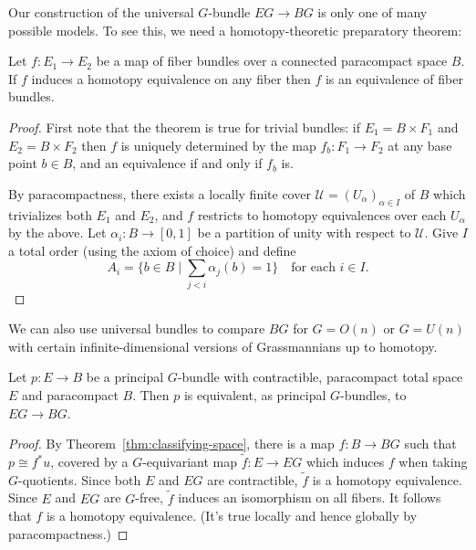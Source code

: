\documentclass[a4paper,openany]{scrbook}
\begin{document}
Our construction of the universal $G$-bundle $EG \to BG$ is only one of many possible models. To see this, we need a homotopy-theoretic preparatory theorem:
\begin{thm}\label{thm:fiber-homotopy-theorem}
Let $f\colon E_1 \to E_2$ be a map of fiber bundles over a connected paracompact space $B$. If $f$ induces a homotopy equivalence on any fiber then $f$ is an equivalence of fiber bundles.
\end{thm}
\begin{proof}
First note that the theorem is true for trivial bundles: if $E_1 = B \times F_1$ and $E_2 = B \times F_2$ then $f$ is uniquely determined by the map $f_b\colon F_1 \to F_2$ at any base point $b\in B$, and an equivalence if and only if $f_b$ is.

By paracompactness, there exists a locally finite cover $\mathcal U=(U_\alpha)_{\alpha \in I}$ of $B$ which trivializes both $E_1$ and $E_2$, and $f$ restricts to homotopy equivalences over each $U_\alpha$ by the above. Let $\alpha_i\colon B \to [0,1]$ be a partition of unity with respect to $\mathcal U$. Give $I$ a total order (using the axiom of choice) and define
\[
A_i = \{ b \in B \mid \sum_{j<i} \alpha_j(b) = 1\} \quad \text{for each $i \in I$.}
\]

\end{proof}

We can also use universal bundles to compare $BG$ for $G=O(n)$ or $G=U(n)$ with certain infinite-dimensional versions of Grassmannians up to homotopy.

\begin{corollary}\label{cor:characterizationfouniversalGspaces}
Let $p\colon E \to B$ be a principal $G$-bundle with contractible, paracompact total space $E$ and paracompact $B$. Then $p$ is equivalent, as principal $G$-bundles, to $EG \to BG$.
\end{corollary}
\begin{proof}
By Theorem~\ref{thm:classifying-space}, there is a map $f\colon B \to BG$ such that $p \cong f^*u$, covered by a $G$-equivariant map $\tilde f\colon E \to EG$ which induces $f$ when taking $G$-quotients. Since both $E$ and $EG$ are contractible, $\tilde f$ is a homotopy equivalence. Since $E$ and $EG$ are $G$-free, $\tilde f$ induces an isomorphism on all fibers. It follows that $f$ is a homotopy equivalence. (It's true locally and hence globally by paracompactness.)
\end{proof}
\end{document}
